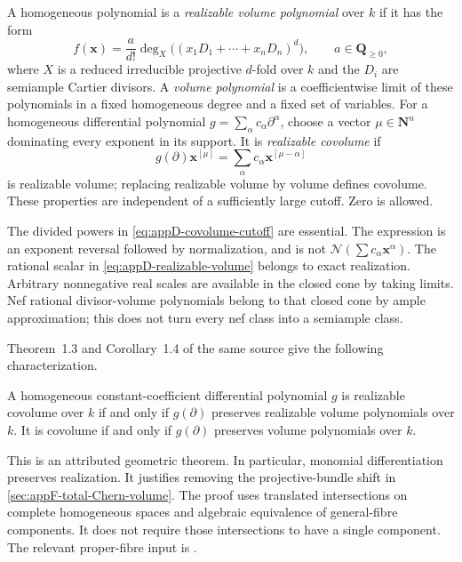 \begin{definition}
\label{def:appD-realizable-volume}
A homogeneous polynomial is a \emph{realizable volume polynomial}
over $k$ if it has the form
\[
 f(\mathbf x)=\frac{a}{d!}
       \deg_X\bigl((x_1D_1+\cdots+x_nD_n)^d\bigr),
 \qquad a\in\mathbf Q_{\geq0},
\tag{D.37}\label{eq:appD-realizable-volume}
\]
where $X$ is a reduced irreducible projective $d$-fold over $k$
and the $D_i$ are semiample Cartier divisors. A \emph{volume
polynomial} is a coefficientwise limit of these polynomials in
a fixed homogeneous degree and a fixed set of variables.
For a homogeneous differential polynomial
$g=\sum_\alpha c_\alpha\partial^\alpha$, choose a vector
$\mu\in\mathbf N^n$ dominating every exponent in its support.
It is \emph{realizable covolume} if
\[
 g(\partial)\mathbf x^{[\mu]}
       =\sum_\alpha c_\alpha\mathbf x^{[\mu-\alpha]}
\tag{D.38}\label{eq:appD-covolume-cutoff}
\]
is realizable volume; replacing realizable volume by volume
defines covolume. These properties are independent of a sufficiently
large cutoff. Zero is allowed.
\end{definition}

The divided powers in \eqref{eq:appD-covolume-cutoff} are essential.
The expression is an exponent reversal followed by normalization,
and is not $\mathcal N(\sum c_\alpha\mathbf x^\alpha)$.
The rational scalar in \eqref{eq:appD-realizable-volume} belongs
to exact realization. Arbitrary nonnegative real scales are available
in the closed cone by taking limits. Nef rational divisor-volume
polynomials belong to that closed cone by ample approximation;
this does not turn every nef class into a semiample class.

Theorem~1.3 and Corollary~1.4 of the same source give the
following characterization.
\begin{theorem}
\label{thm:appD-covolume-preserver}
A homogeneous constant-coefficient differential polynomial $g$
is realizable covolume over $k$ if and only if $g(\partial)$
preserves realizable volume polynomials over $k$.
It is covolume if and only if $g(\partial)$ preserves volume
polynomials over $k$.
\end{theorem}

This is an attributed geometric theorem. In particular, monomial
differentiation preserves realization. It justifies removing the
projective-bundle shift in \cref{sec:appF-total-Chern-volume}.
The proof uses translated intersections on complete homogeneous
spaces and algebraic equivalence of general-fibre components.
It does not require those intersections to have a single component.
The relevant proper-fibre input is
\cite[Lemma~2.6]{HuangHuhMichalekWangWang25RealizationsV2}.

